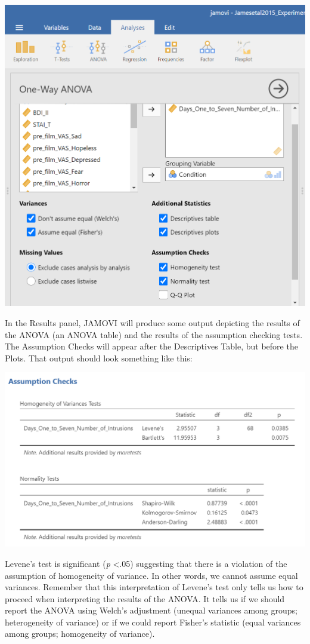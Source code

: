 \documentclass[
]{book}
\begin{document}
\includegraphics{img/OneWayANOVACommandsWithAssumptionChecksAndVariance.png}

In the Results panel, JAMOVI will produce some output depicting the results of the ANOVA (an ANOVA table) and the results of the assumption checking tests. The Assumption Checks will appear after the Descriptives Table, but before the Plots. That output should look something like this:

\includegraphics{img/OneWayANOVAResultsAssumptionChecks.png}

Levene's test is significant (\emph{p} \textless.05) suggesting that there is a violation of the assumption of homogeneity of variance. In other words, we cannot assume equal variances. Remember that this interpretation of Levene's test only tells us how to proceed when interpreting the results of the ANOVA. It tells us if we should report the ANOVA using Welch's adjustment (unequal variances among groups; heterogeneity of variance) or if we could report Fisher's statistic (equal variances among groups; homogeneity of variance).
\end{document}
